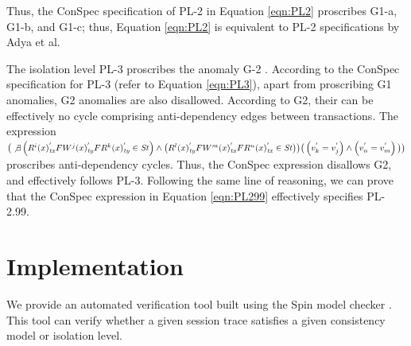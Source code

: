 \documentclass{sig-alternate-05-2015}
\begin{document}
 Thus, the ConSpec
   specification of PL-2 in  Equation \ref{eqn:PL2} proscribes G1-a, G1-b, and G1-c; thus, Equation \ref{eqn:PL2} is
   equivalent to PL-2 specifications by Adya et al.
 \par  The isolation level PL-3 proscribes the anomaly G-2 \cite{DBLP:conf/icde/AdyaLO00}. According to the
 ConSpec specification for PL-3 (refer to Equation \ref{eqn:PL3}), apart from proscribing G1 anomalies, G2 anomalies are
  also disallowed. According to G2, their can be
 effectively no cycle comprising anti-dependency edges between transactions. The expression \\
 $\big( \not\exists  \left({R^i}(x)^{'}_\mathit{tx} F {W^j}(x)^{'}_\mathit{ty} F {R^k}(x)^{'}_\mathit{ty} \in \mathit{St} \right) \wedge \\
  \big( {R^l}(x)^{'}_\mathit{ty} F {W^m}(x)^{'}_\mathit{tx} F {R^n}(x)^{'}_\mathit{tx} \in \mathit{St} \big)  \big) \big(  \left( v_k^{'} = v_j^{'} \right) \wedge
 \left( v_n^{'} = v_m^{'} \right) \big) \big)$ proscribes anti-dependency cycles. Thus, the
 ConSpec expression disallows G2, and effectively follows PL-3. Following the same line of reasoning, we can
  prove that the ConSpec expression in Equation \ref{eqn:PL299} effectively  specifies PL-2.99.

 \section{Implementation}
 We provide an automated verification tool built using the Spin model checker  \cite{Holzmann:2003:SMC:1405716}. This tool can verify whether a given session trace satisfies a given consistency model or isolation level. 
  
\end{document}
